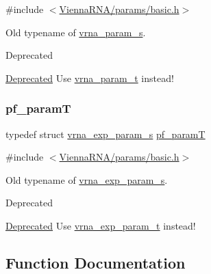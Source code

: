 {\ttfamily \#include $<$\mbox{\hyperlink{params_2basic_8h}{Vienna\+R\+N\+A/params/basic.\+h}}$>$}



Old typename of \mbox{\hyperlink{group__energy__parameters_structvrna__param__s}{vrna\+\_\+param\+\_\+s}}. 

\begin{DoxyRefDesc}{Deprecated}
\item[\mbox{\hyperlink{deprecated__deprecated000140}{Deprecated}}]Use \mbox{\hyperlink{group__energy__parameters_ga8a69ca7d787e4fd6079914f5343a1f35}{vrna\+\_\+param\+\_\+t}} instead! \end{DoxyRefDesc}
\mbox{\label{group__energy__parameters_ga8bffe1828e2cbec101769f5cc0b1535b}} 
\subsubsection{\texorpdfstring{pf\_paramT}{pf\_paramT}}
{\footnotesize\ttfamily typedef struct \mbox{\hyperlink{group__energy__parameters_structvrna__exp__param__s}{vrna\+\_\+exp\+\_\+param\+\_\+s}} \mbox{\hyperlink{group__energy__parameters_ga8bffe1828e2cbec101769f5cc0b1535b}{pf\+\_\+paramT}}}



{\ttfamily \#include $<$\mbox{\hyperlink{params_2basic_8h}{Vienna\+R\+N\+A/params/basic.\+h}}$>$}



Old typename of \mbox{\hyperlink{group__energy__parameters_structvrna__exp__param__s}{vrna\+\_\+exp\+\_\+param\+\_\+s}}. 

\begin{DoxyRefDesc}{Deprecated}
\item[\mbox{\hyperlink{deprecated__deprecated000141}{Deprecated}}]Use \mbox{\hyperlink{group__energy__parameters_ga01d8b92fe734df8d79a6169482c7d8d8}{vrna\+\_\+exp\+\_\+param\+\_\+t}} instead! \end{DoxyRefDesc}


\subsection{Function Documentation}
\mbox{\label{group__energy__parameters_gad0e3e7e74bdc50d1709d40c92993185e}} 
